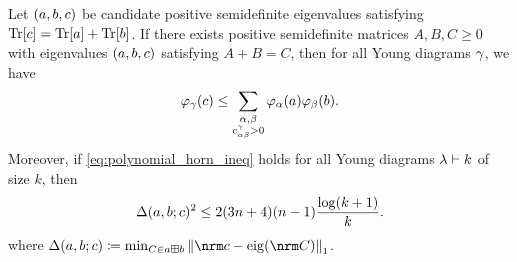 \documentclass[notitlepage, 10pt]{article}
\begin{document}
    \begin{thm}
        Let $(a,b,c)$ be candidate positive semidefinite eigenvalues satisfying ${\operatorname{Tr}[c]}={\operatorname{Tr}[a]}+{\operatorname{Tr}[b]}$.
        If there exists positive semidefinite matrices $A,B,C \geq 0$ with eigenvalues $(a,b,c)$ satisfying $A+B=C$, then for all Young diagrams $\gamma$, we have
        \begin{equation}
            \label{eq:polynomial_horn_ineq}
            \varphi_{\gamma}(c) \leq \sum_{\substack{\alpha,\beta\\c^{\gamma}_{\alpha\beta} > 0}} \varphi_{\alpha}(a)\varphi_{\beta}(b).
        \end{equation}
        Moreover, if \cref{eq:polynomial_horn_ineq} holds for all Young diagrams $\lambda \vdash k$ of size $k$, then
        \begin{equation}
            \Delta(a,b;c)^{2} \leq 2(3n+4)(n-1) \frac{\log (k+1)}{k}.
        \end{equation}
        where $\Delta(\ea,\eb;\ec) \coloneqq \min_{C \in \ea \boxplus \eb}\norm{\nrm \ec -  \eig(\nrm C)}_{1}$.
    \end{thm}
\end{document}
